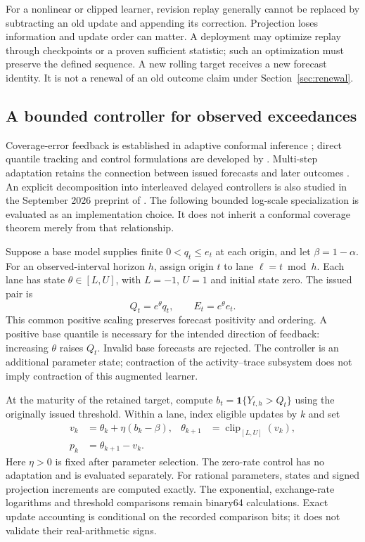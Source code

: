\documentclass[11pt,a4paper]{article}
\theoremstyle{definition}\newtheorem{definition}[theorem]{Definition}
\begin{document}
For a nonlinear or clipped learner, revision replay generally cannot be replaced by subtracting an old update and appending its correction. Projection loses information and update order can matter. A deployment may optimize replay through checkpoints or a proven sufficient statistic; such an optimization must preserve the defined sequence. A new rolling target receives a new forecast identity. It is not a renewal of an old outcome claim under Section~\ref{sec:renewal}.

\subsection{A bounded controller for observed exceedances}
Coverage-error feedback is established in adaptive conformal inference \cite{gibbs2021adaptive}; direct quantile tracking and control formulations are developed by \citet{angelopoulos2023pid}. Multi-step adaptation retains the connection between issued forecasts and later outcomes \cite{hallberg2024multistep}. An explicit decomposition into interleaved delayed controllers is also studied in the September 2026 preprint of \citet{elhalabi2026delayed}. The following bounded log-scale specialization is evaluated as an implementation choice. It does not inherit a conformal coverage theorem merely from that relationship.

Suppose a base model supplies finite $0<q_t\le e_t$ at each origin, and let $\beta=1-\alpha$. For an observed-interval horizon $h$, assign origin $t$ to lane $\ell=t\bmod h$. Each lane has state $\theta\in[L,U]$, with $L=-1$, $U=1$ and initial state zero. The issued pair is
\begin{equation}
 Q_t=e^{\theta}q_t,\qquad E_t=e^{\theta}e_t.
 \label{eq:adaptivescale}
\end{equation}
This common positive scaling preserves forecast positivity and ordering. A positive base quantile is necessary for the intended direction of feedback: increasing $\theta$ raises $Q_t$. Invalid base forecasts are rejected. The controller is an additional parameter state; contraction of the activity--trace subsystem does not imply contraction of this augmented learner.

At the maturity of the retained target, compute $b_t=\mathbf1\{Y_{t,h}>Q_t\}$ using the originally issued threshold. Within a lane, index eligible updates by $k$ and set
\begin{align}
 v_k&=\theta_k+\eta(b_k-\beta), &
 \theta_{k+1}&=\operatorname{clip}_{[L,U]}(v_k),\label{eq:adaptiveupdate}\\
 p_k&=\theta_{k+1}-v_k. &&\label{eq:adaptiveprojection}
\end{align}
Here $\eta>0$ is fixed after parameter selection. The zero-rate control has no adaptation and is evaluated separately. For rational parameters, states and signed projection increments are computed exactly. The exponential, exchange-rate logarithms and threshold comparisons remain binary64 calculations. Exact update accounting is conditional on the recorded comparison bits; it does not validate their real-arithmetic signs.
\end{document}
